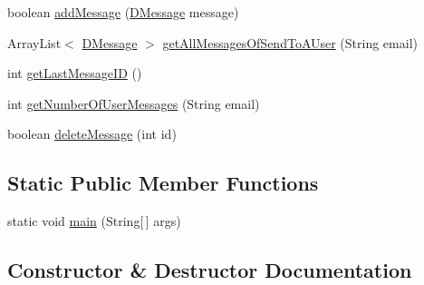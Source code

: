 \begin{DoxyCompactItemize}
\item 
boolean \mbox{\hyperlink{classes_1_1deusto_1_1bspq18_1_1e6_1_1_deusto_box_1_1_server_1_1jdo_1_1dao_1_1_deusto_box_d_a_o_a54afa270fb0e6e8bc7725c52b080649d}{add\+Message}} (\mbox{\hyperlink{classes_1_1deusto_1_1bspq18_1_1e6_1_1_deusto_box_1_1_server_1_1jdo_1_1data_1_1_d_message}{D\+Message}} message)
\item 
Array\+List$<$ \mbox{\hyperlink{classes_1_1deusto_1_1bspq18_1_1e6_1_1_deusto_box_1_1_server_1_1jdo_1_1data_1_1_d_message}{D\+Message}} $>$ \mbox{\hyperlink{classes_1_1deusto_1_1bspq18_1_1e6_1_1_deusto_box_1_1_server_1_1jdo_1_1dao_1_1_deusto_box_d_a_o_a5357c3fa65d1cb8e48114eee52358a9b}{get\+All\+Messages\+Of\+Send\+To\+A\+User}} (String email)
\item 
int \mbox{\hyperlink{classes_1_1deusto_1_1bspq18_1_1e6_1_1_deusto_box_1_1_server_1_1jdo_1_1dao_1_1_deusto_box_d_a_o_acfc34cbf454de0b8ef1bc83ef8c41562}{get\+Last\+Message\+ID}} ()
\item 
int \mbox{\hyperlink{classes_1_1deusto_1_1bspq18_1_1e6_1_1_deusto_box_1_1_server_1_1jdo_1_1dao_1_1_deusto_box_d_a_o_a31147274fcf6c6d1f5d63d2b42c43708}{get\+Number\+Of\+User\+Messages}} (String email)
\item 
boolean \mbox{\hyperlink{classes_1_1deusto_1_1bspq18_1_1e6_1_1_deusto_box_1_1_server_1_1jdo_1_1dao_1_1_deusto_box_d_a_o_a4e42b41382683d87b32810a60080c8d0}{delete\+Message}} (int id)
\end{DoxyCompactItemize}
\subsection*{Static Public Member Functions}
\begin{DoxyCompactItemize}
\item 
static void \mbox{\hyperlink{classes_1_1deusto_1_1bspq18_1_1e6_1_1_deusto_box_1_1_server_1_1jdo_1_1dao_1_1_deusto_box_d_a_o_a82e1c51807d07103a2393ca03506adfd}{main}} (String\mbox{[}$\,$\mbox{]} args)
\end{DoxyCompactItemize}


\subsection{Constructor \& Destructor Documentation}
\mbox{\label{classes_1_1deusto_1_1bspq18_1_1e6_1_1_deusto_box_1_1_server_1_1jdo_1_1dao_1_1_deusto_box_d_a_o_a260d9bf0638f37e6a744558379aee259}} 

